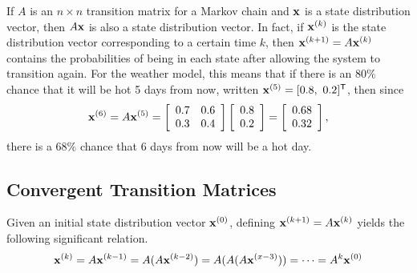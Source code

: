 If $A$ is an $n\times n$ transition matrix for a Markov chain and $\mathbf{x}$ is a state distribution vector, then $A\mathbf{x}$ is also a state distribution vector.
In fact, if $\mathbf{x}^{(k)}$ is the state distribution vector corresponding to a certain time $k$, then $\mathbf{x}^{(k+1)} = A\mathbf{x}^{(k)}$ contains the probabilities of being in each state after allowing the system to transition again.
For the weather model, this means that if there is an $80\%$ chance that it will be hot 5 days from now, written $\mathbf{x}^{(5)} = [0.8,\ 0.2]^{\mathsf T}$, then since
\[
\mathbf{x}^{(6)} = A\mathbf{x}^{(5)} =
\left[\begin{array}{cc}
0.7 & 0.6 \\
0.3 & 0.4 \\
\end{array}\right]
\left[\begin{array}{c}0.8 \\ 0.2\end{array}\right]
=
\left[\begin{array}{c}0.68 \\ 0.32\end{array}\right],
\]
there is a $68\%$ chance that 6 days from now will be a hot day.

\subsection*{Convergent Transition Matrices} %

Given an initial state distribution vector $\mathbf{x}^{(0)}$, defining $\mathbf{x}^{(k+1)} = A\mathbf{x}^{(k)}$ yields the following significant relation.
\[\mathbf{x}^{(k)} = A\mathbf{x}^{(k-1)} = A(A\mathbf{x}^{(k-2)}) = A(A(A\mathbf{x}^{(x-3)})) = \cdots = A^k\mathbf{x}^{(0)}\]

